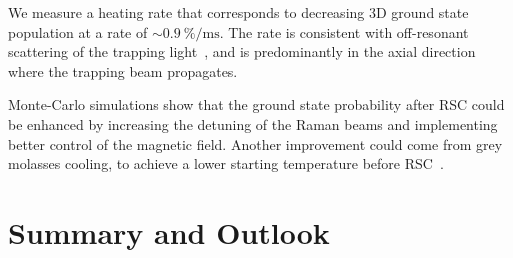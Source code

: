 We measure a heating rate that corresponds to decreasing 3D ground state population
at a rate of $\sim0.9~\mathrm{\%/ms}$.
The rate is consistent with off-resonant scattering of
the trapping light~\cite{grimm_optical_2000},
and is predominantly in the axial direction where the trapping beam propagates.

Monte-Carlo simulations show that the ground state probability after RSC
could be enhanced by increasing the detuning of the Raman beams and implementing
better control of the magnetic field. Another improvement could come from
grey molasses cooling,
to achieve a lower starting temperature before RSC~\cite{colzi_sub-doppler_2016}.

\section{Summary and Outlook}
\label{ch:rsc:summary}


